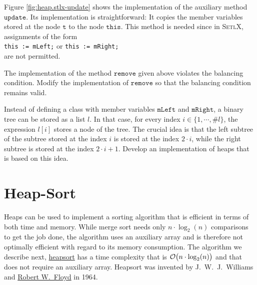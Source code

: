 \noindent 
Figure \ref{fig:heap.stlx-update} shows the implementation of the auxiliary method $\mathtt{update}$.
Its implementation is straightforward: It copies the member variables stored at the node $\mathtt{t}$
to the node $\mathtt{this}$.  This method is needed since in \textsc{SetlX}, assignments of the form
\\[0.2cm]
\hspace*{1.3cm}
\texttt{this := mLeft;} \quad or \quad \texttt{this := mRight;}
\\[0.2cm]
are not permitted.


\exercise
The implementation of the method $\mathtt{remove}$ given above violates the balancing condition.
Modify the implementation of $\mathtt{remove}$ so that the balancing condition remains valid.

\exercise
Instead of defining a class with member variables $\mathtt{mLeft}$ and $\mathtt{mRight}$, a binary tree
can be stored as a list $l$.  In that case, for every index $i \in \{1, \cdots, \mathtt{\#}l \}$,
the expression $l[i]$ stores a node of the tree.  The crucial idea is that the left subtree of the
subtree stored at the index $i$ is stored at the index $2 \cdot i$, while the right subtree is
stored at the index $2 \cdot i + 1$.  Develop an implementation of heaps that is based on this idea.

\section{Heap-Sort}
Heaps can be used to implement a sorting algorithm that is efficient in terms of both time and
memory. While merge sort needs only $n \cdot \log_2(n)$ comparisons to get the job done, the
algorithm uses an auxiliary array and is therefore not optimally efficient with regard to its memory
consumption.  The algorithm we describe next, \href{https://en.wikipedia.org/wiki/Heapsort}{heapsort} has
a time complexity that is $\mathcal{O}\bigl(n \cdot \log_2(n)\bigr)$ and that does not require an auxiliary
array.  Heapsort was invented by J.~W.~J.~Williams and
\href{https://en.wikipedia.org/wiki/Robert_W._Floyd}{Robert W.~Floyd} in 1964.

